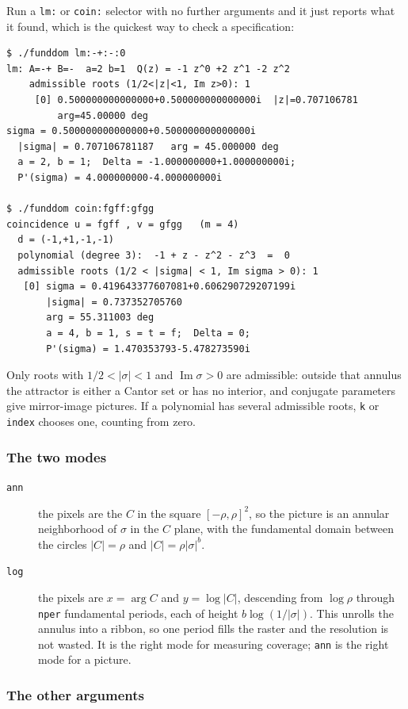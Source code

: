 \documentclass{amsart}
\begin{document}
Run a \texttt{lm:} or \texttt{coin:} selector with no further arguments and it just reports what
it found, which is the quickest way to check a specification:
\begin{verbatim}
$ ./funddom lm:-+:-:0
lm: A=-+ B=-  a=2 b=1  Q(z) = -1 z^0 +2 z^1 -2 z^2
    admissible roots (1/2<|z|<1, Im z>0): 1
     [0] 0.500000000000000+0.500000000000000i  |z|=0.707106781
         arg=45.00000 deg
sigma = 0.500000000000000+0.500000000000000i
  |sigma| = 0.707106781187   arg = 45.000000 deg
  a = 2, b = 1;  Delta = -1.000000000+1.000000000i;
  P'(sigma) = 4.000000000-4.000000000i

$ ./funddom coin:fgff:gfgg
coincidence u = fgff , v = gfgg   (m = 4)
  d = (-1,+1,-1,-1)
  polynomial (degree 3):  -1 + z - z^2 - z^3  =  0
  admissible roots (1/2 < |sigma| < 1, Im sigma > 0): 1
   [0] sigma = 0.419643377607081+0.606290729207199i
       |sigma| = 0.737352705760
       arg = 55.311003 deg
       a = 4, b = 1, s = t = f;  Delta = 0;
       P'(sigma) = 1.470353793-5.478273590i
\end{verbatim}
Only roots with $1/2 < |\sigma| < 1$ and $\operatorname{Im}\sigma > 0$ are admissible: outside
that annulus the attractor is either a Cantor set or has no interior, and conjugate parameters
give mirror-image pictures.  If a polynomial has several admissible roots, \texttt{k} or
\texttt{index} chooses one, counting from zero.

\subsubsection{The two modes}

\begin{description}
\item[\texttt{ann}] the pixels are the $C$ in the square $[-\rho,\rho]^2$, so the picture is an
annular neighborhood of $\sigma$ in the $C$ plane, with the fundamental domain between the
circles $|C| = \rho$ and $|C| = \rho|\sigma|^b$.
\item[\texttt{log}] the pixels are $x = \arg C$ and $y = \log|C|$, descending from $\log\rho$
through \texttt{nper} fundamental periods, each of height $b\log(1/|\sigma|)$.  This unrolls the
annulus into a ribbon, so one period fills the raster and the resolution is not wasted.  It is the
right mode for measuring coverage; \texttt{ann} is the right mode for a picture.
\end{description}

\subsubsection{The other arguments}
\end{document}
